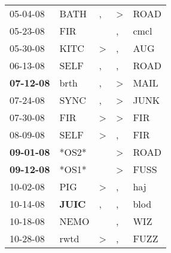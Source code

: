 \begin{supertabular}{p{0.07\textwidth}p{0.06\textwidth}p{0.02\textwidth}p{0.02\textwidth}p{0.06\textwidth}}
          05-04-08\textsuperscript{} &           BATH\textsuperscript{} &                , &     \textgreater &           ROAD\textsuperscript{} \\
          05-23-08\textsuperscript{} &            FIR\textsuperscript{} &                  &                , &           cmcl\textsuperscript{} \\
          05-30-08\textsuperscript{} &           KITC\textsuperscript{} &     \textgreater &                , &            AUG\textsuperscript{} \\
          06-13-08\textsuperscript{} &           SELF\textsuperscript{} &                , &                , &           ROAD\textsuperscript{} \\
 \textbf{07-12-08\textsuperscript{}} &           brth\textsuperscript{} &                , &     \textgreater &           MAIL\textsuperscript{} \\
          07-24-08\textsuperscript{} &           SYNC\textsuperscript{} &                , &     \textgreater &           JUNK\textsuperscript{} \\
          07-30-08\textsuperscript{} &            FIR\textsuperscript{} &     \textgreater &     \textgreater &            FIR\textsuperscript{} \\
          08-09-08\textsuperscript{} &           SELF\textsuperscript{} &     \textgreater &                , &            FIR\textsuperscript{} \\
 \textbf{09-01-08\textsuperscript{}} &                            *OS2* &                  &     \textgreater &           ROAD\textsuperscript{} \\
 \textbf{09-12-08\textsuperscript{}} &                            *OS1* &                  &     \textgreater &           FUSS\textsuperscript{} \\
          10-02-08\textsuperscript{} &            PIG\textsuperscript{} &     \textgreater &                , &            haj\textsuperscript{} \\
          10-14-08\textsuperscript{} &  \textbf{JUIC\textsuperscript{}} &                , &                , &           blod\textsuperscript{} \\
          10-18-08\textsuperscript{} &           NEMO\textsuperscript{} &                  &                , &            WIZ\textsuperscript{} \\
          10-28-08\textsuperscript{} &           rwtd\textsuperscript{} &     \textgreater &                , &           FUZZ\textsuperscript{} \\

\end{supertabular}
